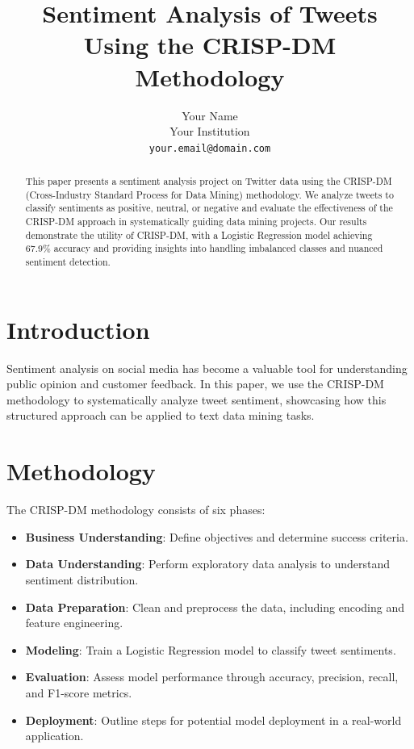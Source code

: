 \documentclass{article}
\title{Sentiment Analysis of Tweets Using the CRISP-DM Methodology}
\author{Your Name \\
        Your Institution \\
        \texttt{your.email@domain.com}}
\date{}
\begin{document}
\maketitle

\begin{abstract}
This paper presents a sentiment analysis project on Twitter data using the CRISP-DM (Cross-Industry Standard Process for Data Mining) methodology. We analyze tweets to classify sentiments as positive, neutral, or negative and evaluate the effectiveness of the CRISP-DM approach in systematically guiding data mining projects. Our results demonstrate the utility of CRISP-DM, with a Logistic Regression model achieving 67.9\% accuracy and providing insights into handling imbalanced classes and nuanced sentiment detection.
\end{abstract}

\section{Introduction}
Sentiment analysis on social media has become a valuable tool for understanding public opinion and customer feedback. In this paper, we use the CRISP-DM methodology to systematically analyze tweet sentiment, showcasing how this structured approach can be applied to text data mining tasks.

\section{Methodology}
The CRISP-DM methodology consists of six phases:
\begin{itemize}
    \item \textbf{Business Understanding}: Define objectives and determine success criteria.
    \item \textbf{Data Understanding}: Perform exploratory data analysis to understand sentiment distribution.
    \item \textbf{Data Preparation}: Clean and preprocess the data, including encoding and feature engineering.
    \item \textbf{Modeling}: Train a Logistic Regression model to classify tweet sentiments.
    \item \textbf{Evaluation}: Assess model performance through accuracy, precision, recall, and F1-score metrics.
    \item \textbf{Deployment}: Outline steps for potential model deployment in a real-world application.
\end{itemize}
\end{document}
